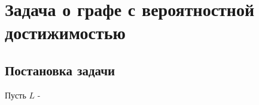 \section{Задача о графе с вероятностной достижимостью}

\subsection{Постановка задачи}
\par{Пусть $L$ - }
